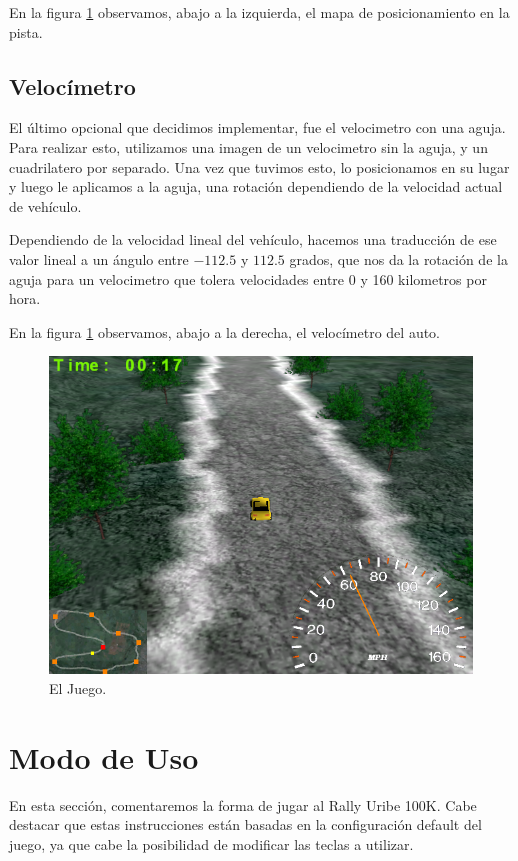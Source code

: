 \documentclass[a4paper,10pt]{article}
\begin{document}
En la figura \ref{fig:game} observamos, abajo a la izquierda, el mapa de
posicionamiento en la pista.

\subsection{Veloc\'imetro}

El \'ultimo opcional que decidimos implementar, fue el velocimetro con una
aguja.  Para realizar esto, utilizamos una imagen de un velocimetro sin la
aguja, y un cuadrilatero por separado.  Una vez que tuvimos esto, lo
posicionamos en su lugar y luego le aplicamos a la aguja, una rotaci\'on
dependiendo de la velocidad actual de veh\'iculo.

Dependiendo de la velocidad lineal del veh\'iculo, hacemos una traducci\'on de
ese valor lineal a un \'angulo entre $-112.5$ y $112.5$ grados, que nos da la
rotaci\'on de la aguja para un velocimetro que tolera velocidades entre 0 y 160
kilometros por hora.

En la figura \ref{fig:game} observamos, abajo a la derecha, el
veloc\'imetro del auto.


\begin{figure}
 \centering
 \includegraphics[bb=0 0 640 480,scale=0.4,keepaspectratio=true]{./game.png}
 \caption{El Juego.}
 \label{fig:game}
\end{figure}


\section{Modo de Uso}
\label{mododeuso}
En esta secci\'on, comentaremos la forma de jugar al Rally Uribe 100K.  Cabe
destacar que estas instrucciones est\'an basadas en la configuraci\'on default
del
juego, ya que cabe la posibilidad de modificar las teclas a utilizar.
\end{document}
